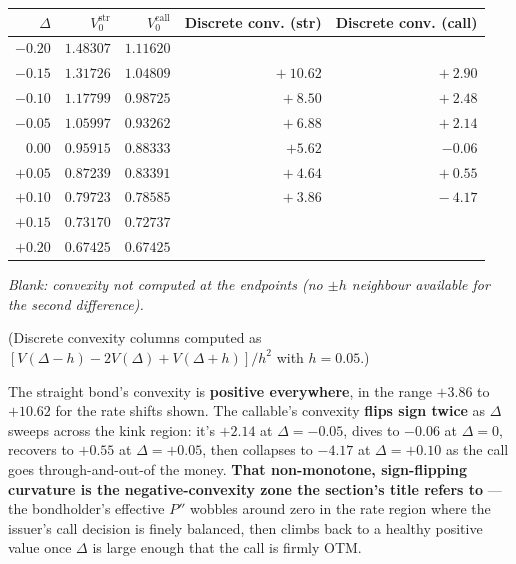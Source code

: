 \documentclass[
  10pt,
  twoside]{book}
\newcounter{none} %
\begin{document}
{\def\LTcaptype{none} %
\begin{table}[H]
\centering
\begin{tabular}{|r|r|r|r|r|}
\toprule
\(\Delta\) & \(V_0^{\text{str}}\) & \(V_0^{\text{call}}\) & Discrete conv. (str) & Discrete conv. (call) \\
\midrule



\(-0.20\) & \(1.48307\) & \(1.11620\) & & \\
\(-0.15\) & \(1.31726\) & \(1.04809\) & \(\phantom{0}+10.62\) &
\(\phantom{0}+2.90\) \\
\(-0.10\) & \(1.17799\) & \(0.98725\) & \(\phantom{00}+8.50\) &
\(\phantom{0}+2.48\) \\
\(-0.05\) & \(1.05997\) & \(0.93262\) & \(\phantom{00}+6.88\) &
\(\phantom{0}+2.14\) \\
\(\mathbf{0.00}\) & \(\mathbf{0.95915}\) & \(\mathbf{0.88333}\) &
\(\phantom{0}\mathbf{+5.62}\) & \(\phantom{0}\mathbf{-0.06}\) \\
\(+0.05\) & \(0.87239\) & \(0.83391\) & \(\phantom{00}+4.64\) &
\(\phantom{0}+0.55\) \\
\(+0.10\) & \(0.79723\) & \(0.78585\) & \(\phantom{00}+3.86\) &
\(\phantom{0}-4.17\) \\
\(+0.15\) & \(0.73170\) & \(0.72737\) & & \\
\(+0.20\) & \(0.67425\) & \(0.67425\) & & \\
\bottomrule
\end{tabular}
\end{table}
}

\emph{Blank: convexity not computed at the endpoints (no \(\pm h\)
neighbour available for the second difference).}

(Discrete convexity columns computed as
\([V(\Delta - h) - 2V(\Delta) + V(\Delta + h)] / h^2\) with
\(h = 0.05\).)

The straight bond's convexity is \textbf{positive everywhere}, in the
range \(+3.86\) to \(+10.62\) for the rate shifts shown. The callable's
convexity \textbf{flips sign twice} as \(\Delta\) sweeps across the kink
region: it's \(+2.14\) at \(\Delta = -0.05\), dives to \(-0.06\) at
\(\Delta = 0\), recovers to \(+0.55\) at \(\Delta = +0.05\), then
collapses to \(-4.17\) at \(\Delta = +0.10\) as the call goes
through-and-out-of the money. \textbf{That non-monotone, sign-flipping
curvature is the negative-convexity zone the section's title refers to}
--- the bondholder's effective \(P''\) wobbles around zero in the rate
region where the issuer's call decision is finely balanced, then climbs
back to a healthy positive value once \(\Delta\) is large enough that
the call is firmly OTM.
\end{document}
